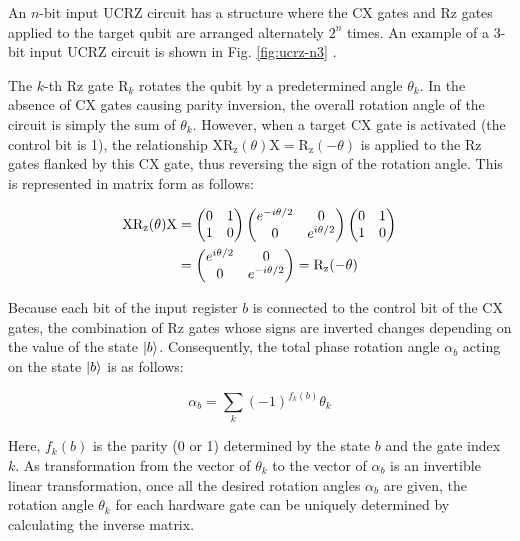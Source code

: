 \documentclass[aip-draft.tex]{subfiles}
\begin{document}
An $n$-bit input UCRZ circuit has a structure where the CX gates and Rz gates
applied to the target qubit are arranged alternately $2^n$ times. An example of
a 3-bit input UCRZ circuit is shown in Fig. \ref{fig:ucrz-n3}
\cite{Mottonen2004.PhysRevLett.93.130502}.

The $k$-th Rz gate $\mathrm{R}_k$ rotates the qubit by a predetermined angle
$\theta_k$. In the absence of CX gates causing parity inversion, the overall
rotation angle of the circuit is simply the sum of $\theta_k$. However, when a
target CX gate is activated (the control bit is 1), the relationship
$\mathrm{X}\mathrm{R_z}(\theta)\mathrm{X} = \mathrm{R_z}(-\theta)$ is applied to
the Rz gates flanked by this CX gate, thus reversing the sign of the rotation angle.
This is represented in matrix form as follows:

\begin{align}
    \mathrm{X}\mathrm{R_z}(\theta)\mathrm{X}
    &= \begin{pmatrix} 0 & 1 \\ 1 & 0 \end{pmatrix}
    \begin{pmatrix} e^{-i\theta/2} & 0 \\ 0 & e^{i\theta/2} \end{pmatrix}
    \begin{pmatrix} 0 & 1 \\ 1 & 0 \end{pmatrix} \notag\\
    &= \begin{pmatrix} e^{i\theta/2} & 0 \\ 0 & e^{-i\theta/2} \end{pmatrix}
    = \mathrm{R_z}(-\theta)
\end{align}

Because each bit of the input register $b$ is connected to the control bit of
the CX gates, the combination of Rz gates whose signs are inverted changes
depending on the value of the state $\ket{b}$. Consequently, the total phase
rotation angle $\alpha_b$ acting on the state $\ket{b}$ is as follows:

\begin{equation}
    \alpha_b = \sum_{k}{(-1)^{f_k(b)}\theta_k}
\end{equation}

Here, $f_k(b)$ is the parity (0 or 1) determined by the state $b$ and the gate
index $k$. As transformation from the vector of $\theta_k$ to the vector
of $\alpha_b$ is an invertible linear transformation, once all the desired 
rotation angles $\alpha_b$ are given, the rotation angle $\theta_k$ for each
hardware gate can be uniquely determined by calculating the inverse matrix.
\end{document}
